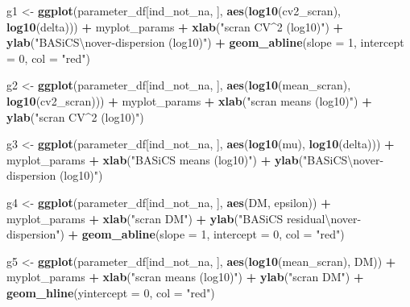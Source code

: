 \documentclass[9pt,a4paper,]{extarticle}
\newenvironment{Shaded}{\begin{snugshade}}{\end{snugshade}}
\newcommand{\CharTok}[1]{\textcolor[rgb]{0.31,0.60,0.02}{#1}}
\newcommand{\DataTypeTok}[1]{\textcolor[rgb]{0.13,0.29,0.53}{#1}}
\newcommand{\DecValTok}[1]{\textcolor[rgb]{0.00,0.00,0.81}{#1}}
\newcommand{\KeywordTok}[1]{\textcolor[rgb]{0.13,0.29,0.53}{\textbf{#1}}}
\newcommand{\NormalTok}[1]{#1}
\newcommand{\OperatorTok}[1]{\textcolor[rgb]{0.81,0.36,0.00}{\textbf{#1}}}
\newcommand{\StringTok}[1]{\textcolor[rgb]{0.31,0.60,0.02}{#1}}
\begin{document}
\begin{Shaded}
\begin{Highlighting}[]
\NormalTok{g1 <-}\StringTok{ }\KeywordTok{ggplot}\NormalTok{(parameter_df[ind_not_na, ], }\KeywordTok{aes}\NormalTok{(}\KeywordTok{log10}\NormalTok{(cv2_scran), }\KeywordTok{log10}\NormalTok{(delta))) }\OperatorTok{+}
\StringTok{  }\NormalTok{myplot_params }\OperatorTok{+}
\StringTok{  }\KeywordTok{xlab}\NormalTok{(}\StringTok{"scran CV^2 (log10)"}\NormalTok{) }\OperatorTok{+}
\StringTok{  }\KeywordTok{ylab}\NormalTok{(}\StringTok{"BASiCS}\CharTok{\textbackslash{}n}\StringTok{over-dispersion (log10)"}\NormalTok{) }\OperatorTok{+}
\StringTok{  }\KeywordTok{geom_abline}\NormalTok{(}\DataTypeTok{slope =} \DecValTok{1}\NormalTok{, }\DataTypeTok{intercept =} \DecValTok{0}\NormalTok{, }\DataTypeTok{col =} \StringTok{"red"}\NormalTok{)}

\NormalTok{g2 <-}\StringTok{ }\KeywordTok{ggplot}\NormalTok{(parameter_df[ind_not_na, ], }\KeywordTok{aes}\NormalTok{(}\KeywordTok{log10}\NormalTok{(mean_scran), }\KeywordTok{log10}\NormalTok{(cv2_scran))) }\OperatorTok{+}
\StringTok{  }\NormalTok{myplot_params }\OperatorTok{+}
\StringTok{  }\KeywordTok{xlab}\NormalTok{(}\StringTok{"scran means (log10)"}\NormalTok{) }\OperatorTok{+}
\StringTok{  }\KeywordTok{ylab}\NormalTok{(}\StringTok{"scran CV^2 (log10)"}\NormalTok{)}

\NormalTok{g3 <-}\StringTok{ }\KeywordTok{ggplot}\NormalTok{(parameter_df[ind_not_na, ], }\KeywordTok{aes}\NormalTok{(}\KeywordTok{log10}\NormalTok{(mu), }\KeywordTok{log10}\NormalTok{(delta))) }\OperatorTok{+}
\StringTok{  }\NormalTok{myplot_params }\OperatorTok{+}
\StringTok{  }\KeywordTok{xlab}\NormalTok{(}\StringTok{"BASiCS means (log10)"}\NormalTok{) }\OperatorTok{+}
\StringTok{  }\KeywordTok{ylab}\NormalTok{(}\StringTok{"BASiCS}\CharTok{\textbackslash{}n}\StringTok{over-dispersion (log10)"}\NormalTok{)}

\NormalTok{g4 <-}\StringTok{ }\KeywordTok{ggplot}\NormalTok{(parameter_df[ind_not_na, ], }\KeywordTok{aes}\NormalTok{(DM, epsilon)) }\OperatorTok{+}
\StringTok{  }\NormalTok{myplot_params }\OperatorTok{+}
\StringTok{  }\KeywordTok{xlab}\NormalTok{(}\StringTok{"scran DM"}\NormalTok{) }\OperatorTok{+}
\StringTok{  }\KeywordTok{ylab}\NormalTok{(}\StringTok{"BASiCS residual}\CharTok{\textbackslash{}n}\StringTok{over-dispersion"}\NormalTok{) }\OperatorTok{+}
\StringTok{  }\KeywordTok{geom_abline}\NormalTok{(}\DataTypeTok{slope =} \DecValTok{1}\NormalTok{, }\DataTypeTok{intercept =} \DecValTok{0}\NormalTok{, }\DataTypeTok{col =} \StringTok{"red"}\NormalTok{)}

\NormalTok{g5 <-}\StringTok{ }\KeywordTok{ggplot}\NormalTok{(parameter_df[ind_not_na, ], }\KeywordTok{aes}\NormalTok{(}\KeywordTok{log10}\NormalTok{(mean_scran), DM)) }\OperatorTok{+}
\StringTok{  }\NormalTok{myplot_params }\OperatorTok{+}
\StringTok{  }\KeywordTok{xlab}\NormalTok{(}\StringTok{"scran means (log10)"}\NormalTok{) }\OperatorTok{+}
\StringTok{  }\KeywordTok{ylab}\NormalTok{(}\StringTok{"scran DM"}\NormalTok{) }\OperatorTok{+}
\StringTok{  }\KeywordTok{geom_hline}\NormalTok{(}\DataTypeTok{yintercept =} \DecValTok{0}\NormalTok{, }\DataTypeTok{col =} \StringTok{"red"}\NormalTok{)}


\end{Highlighting}
\end{Shaded}
\end{document}
